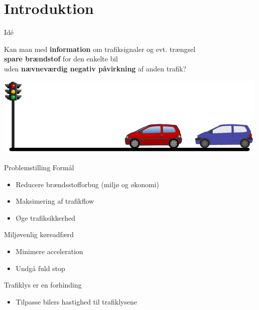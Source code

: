 \section{Introduktion}

\begin{frame}{Idé}
\begin{center}
Kan man med \textbf{information} om trafiksignaler og evt. trængsel\\\textbf{spare brændstof} for den enkelte bil\\uden \textbf{nævneværdig negativ påvirkning} af anden trafik?
\end{center}
\includegraphics[width=1\textwidth]{../images/idea.png}
\end{frame}

\begin{frame}{Problemstilling}
Formål
\begin{itemize}
\item Reducere brændsstofforbug (miljø og økonomi)
\item Maksimering af trafikflow
\item Øge trafiksikkerhed
\end{itemize}

\vspace{5mm}
Miljøvenlig køreadfærd
\begin{itemize}
\item Minimere acceleration
\item Undgå fuld stop
\end{itemize}

\vspace{5mm}
Trafiklys er en forhinding
\begin{itemize}
\item Tilpasse bilers hastighed til trafiklysene
\end{itemize}
\end{frame}

